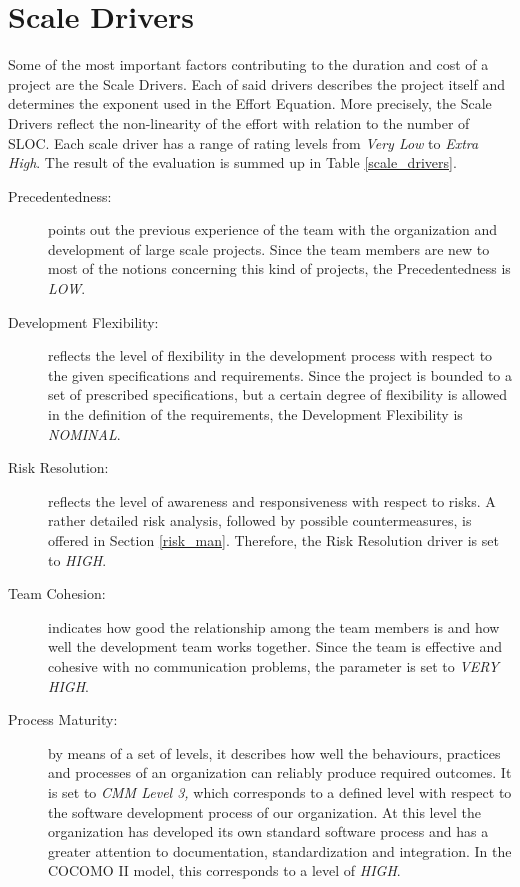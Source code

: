 \section{Scale Drivers}
Some of the most important factors contributing to the duration and cost of a project are the Scale Drivers. Each of said drivers describes the project itself and determines the exponent used in the Effort Equation. More precisely, the Scale Drivers reflect the non-linearity of the effort with relation to the number of SLOC. Each scale driver has a range of rating levels from \textit{Very Low} to \textit{Extra High}. The result of the evaluation is summed up in Table \ref{scale_drivers}.

\begin{description}
\item[Precedentedness:] points out the previous experience of the team with the organization and development of large scale projects. Since the team members are new to most of the notions concerning this kind of projects, the Precedentedness is \textit{LOW}.
\item[Development Flexibility:] reflects the level of flexibility in the development process with respect to the given specifications and requirements. Since the project is bounded to a set of prescribed specifications, but a certain degree of flexibility is allowed in the definition of the requirements, the Development Flexibility is \textit{NOMINAL}.
\item[Risk Resolution:] reflects the level of awareness and responsiveness with respect to risks. A rather detailed risk analysis, followed by possible countermeasures, is offered in Section \ref{risk_man}. Therefore, the Risk Resolution driver is set to \textit{HIGH}.
\item[Team Cohesion:] indicates how good the relationship among the team members is and how well the development team works together. Since the team is effective and cohesive with no communication problems, the parameter is set to \textit{VERY HIGH}.
\item[Process Maturity:] by means of a set of levels, it describes how well the behaviours, practices and processes of an organization can reliably produce required outcomes. It is set to \textit{CMM Level 3,} which corresponds to a defined level with respect to the software development process of our organization. At this level the organization has developed its own standard software process and has a greater attention to documentation, standardization and integration. In the COCOMO II model, this corresponds to a level of \textit{HIGH}.
\end{description}

